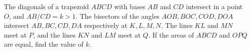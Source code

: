 The diagonals of a trapezoid $ABCD$ with bases $AB$ and $CD$ intersect in a point $O$, and $AB/CD=k>1$. The bisectors of the angles $AOB,BOC,COD,DOA$ intersect $AB,BC,CD,DA$ respectively at $K,L,M,N$. The lines $KL$ and $MN$ meet at $P$, and the lines $KN$ and $LM$ meet at $Q$. If the areas of $ABCD$ and $OPQ$ are equal, find the value of $k$.